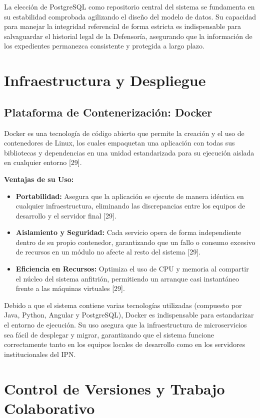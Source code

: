 La elección de PostgreSQL como repositorio central del sistema se fundamenta en su estabilidad comprobada agilizando el diseño del modelo de datos. Su capacidad para manejar la integridad referencial de forma estricta es indispensable para salvaguardar el historial legal de la Defensoría, asegurando que la información de los expedientes permanezca consistente y protegida a largo plazo.

\section{Infraestructura y Despliegue}
\subsection{Plataforma de Contenerización: Docker}
Docker es una tecnología de código abierto que permite la creación y el uso de contenedores de Linux, los cuales empaquetan una aplicación con todas sus bibliotecas y dependencias en una unidad estandarizada para su ejecución aislada en cualquier entorno [29].

\textbf{Ventajas de su Uso:}
\begin{itemize}
    \item \textbf{Portabilidad:} Asegura que la aplicación se ejecute de manera idéntica en cualquier infraestructura, eliminando las discrepancias entre los equipos de desarrollo y el servidor final [29].
    \item \textbf{Aislamiento y Seguridad:} Cada servicio opera de forma independiente dentro de su propio contenedor, garantizando que un fallo o consumo excesivo de recursos en un módulo no afecte al resto del sistema [29].
    \item \textbf{Eficiencia en Recursos:} Optimiza el uso de CPU y memoria al compartir el núcleo del sistema anfitrión, permitiendo un arranque casi instantáneo frente a las máquinas virtuales [29].
\end{itemize}

Debido a que el sistema contiene varias tecnologías utilizadas (compuesto por Java, Python, Angular y PostgreSQL), Docker es indispensable para estandarizar el entorno de ejecución. Su uso asegura que la infraestructura de microservicios sea fácil de desplegar y migrar, garantizando que el sistema funcione correctamente tanto en los equipos locales de desarrollo como en los servidores institucionales del IPN.

\section{Control de Versiones y Trabajo Colaborativo}
